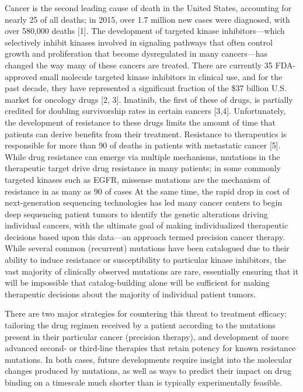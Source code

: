 \documentclass[conference]{IEEEtran}
\begin{document}
Cancer is the second leading cause of death in the United States, accounting for nearly 25 of all deaths; in 2015, over 1.7 million new cases were diagnosed, with over 580,000 deaths [1]. The development of targeted kinase inhibitors—which selectively inhibit kinases involved in signaling pathways that often control growth and proliferation that become dysregulated in many cancers—has changed the way many of these cancers are treated. There are currently 35 FDA-approved small molecule targeted kinase inhibitors in clinical use, and for the past decade, they have represented a significant fraction of the \$37 billion U.S. market for oncology drugs [2, 3]. Imatinib, the first of these of drugs, is partially credited for doubling survivorship rates in certain cancers [3,4]. Unfortunately, the development of resistance to these drugs limits the amount of time that patients can derive benefits from their treatment. Resistance to therapeutics is responsible for more than 90 of deaths in patients with metastatic cancer [5]. While drug resistance can emerge via multiple mechanisms, mutations in the therapeutic target drive drug resistance in many patients; in some commonly targeted kinases such as EGFR, missense mutations are the mechanism of resistance in as many as 90 of cases           
At the same time, the rapid drop in cost of next-generation sequencing technologies has led many cancer centers to begin deep sequencing patient tumors to identify the genetic alterations driving individual cancers, with the ultimate goal of making individualized therapeutic decisions based upon this data—an approach termed precision cancer therapy. While several common (recurrent) mutations have been catalogued due to their ability to induce resistance or susceptibility to particular kinase inhibitors, the vast majority of clinically observed mutations are rare, essentially ensuring that it will be impossible that catalog-building alone will be sufficient for making therapeutic decisions about the majority of individual patient tumors.

There are two major strategies for countering this threat to treatment efficacy: tailoring the drug regimen received by a patient according to the mutations present in their particular cancer (precision therapy), and development of more advanced second- or third-line therapies that retain potency for known resistance mutations. In both cases, future developments require insight into the molecular changes produced by mutations, as well as ways to predict their impact on drug binding on a timescale much shorter than is typically experimentally feasible. 
\end{document}
